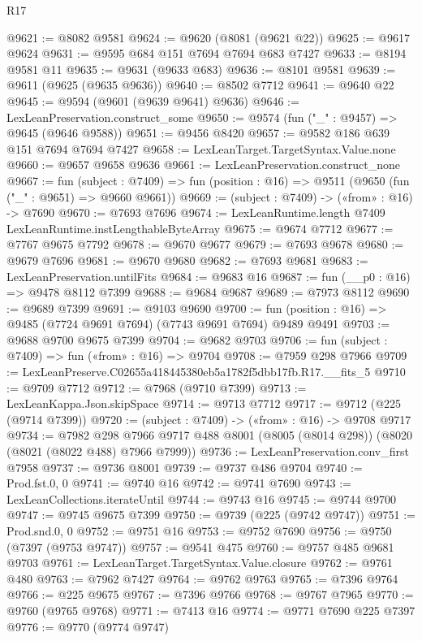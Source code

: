 \begin{lexlean}{R17}
\begin{coremodule}
@9621 := @8082 @9581
@9624 := @9620 (@8081 (@9621 @22))
@9625 := @9617 @9624
@9631 := @9595 @684 @151 @7694 @7694 @683 @7427
@9633 := @8194 @9581 @11
@9635 := @9631 (@9633 @683)
@9636 := @8101 @9581
@9639 := @9611 (@9625 (@9635 @9636))
@9640 := @8502 @7712
@9641 := @9640 @22
@9645 := @9594 (@9601 (@9639 @9641) @9636)
@9646 := LexLeanPreservation.construct_some
@9650 := @9574 (fun ("_" : @9457) => @9645 (@9646 @9588))
@9651 := @9456 @8420
@9657 := @9582 @186 @639 @151 @7694 @7694 @7427
@9658 := LexLeanTarget.TargetSyntax.Value.none
@9660 := @9657 @9658 @9636
@9661 := LexLeanPreservation.construct_none
@9667 := fun (subject : @7409) =>
  fun (position : @16) => @9511 (@9650 (fun ("_" : @9651) => @9660 @9661))
@9669 := (subject : @7409) -> («from» : @16) -> @7690
@9670 := @7693 @7696
@9674 := LexLeanRuntime.length @7409 LexLeanRuntime.instLengthableByteArray
@9675 := @9674 @7712
@9677 := @7767 @9675 @7792
@9678 := @9670 @9677
@9679 := @7693 @9678
@9680 := @9679 @7696
@9681 := @9670 @9680
@9682 := @7693 @9681
@9683 := LexLeanPreservation.untilFits
@9684 := @9683 @16
@9687 := fun (__p0 : @16) => @9478 @8112 @7399
@9688 := @9684 @9687
@9689 := @7973 @8112
@9690 := @9689 @7399
@9691 := @9103 @9690
@9700 := fun (position : @16) => @9485 (@7724 @9691 @7694) (@7743 @9691 @7694) @9489 @9491
@9703 := @9688 @9700 @9675 @7399
@9704 := @9682 @9703
@9706 := fun (subject : @7409) => fun («from» : @16) => @9704
@9708 := @7959 @298 @7966
@9709 := LexLeanPreserve.C02655a418445380eb5a1782f5dbb17fb.R17.__fits_5
@9710 := @9709 @7712
@9712 := @7968 (@9710 @7399)
@9713 := LexLeanKappa.Json.skipSpace
@9714 := @9713 @7712
@9717 := @9712 (@225 (@9714 @7399))
@9720 := (subject : @7409) -> («from» : @16) -> @9708 @9717
@9734 := @7982
    @298
    @7966
    @9717
    @488
    @8001
    (@8005 (@8014 @298))
    (@8020 (@8021 (@8022 @488) @7966 @7999))
@9736 := LexLeanPreservation.conv_first @7958
@9737 := @9736 @8001
@9739 := @9737 @486 @9704
@9740 := Prod.fst.{0, 0}
@9741 := @9740 @16
@9742 := @9741 @7690
@9743 := LexLeanCollections.iterateUntil
@9744 := @9743 @16
@9745 := @9744 @9700
@9747 := @9745 @9675 @7399
@9750 := @9739 (@225 (@9742 @9747))
@9751 := Prod.snd.{0, 0}
@9752 := @9751 @16
@9753 := @9752 @7690
@9756 := @9750 (@7397 (@9753 @9747))
@9757 := @9541 @475
@9760 := @9757 @485 @9681 @9703
@9761 := LexLeanTarget.TargetSyntax.Value.closure
@9762 := @9761 @480
@9763 := @7962 @7427
@9764 := @9762 @9763
@9765 := @7396 @9764
@9766 := @225 @9675
@9767 := @7396 @9766
@9768 := @9767 @7965
@9770 := @9760 (@9765 @9768)
@9771 := @7413 @16
@9774 := @9771 @7690 @225 @7397
@9776 := @9770 (@9774 @9747)

\end{coremodule}
\end{lexlean}
